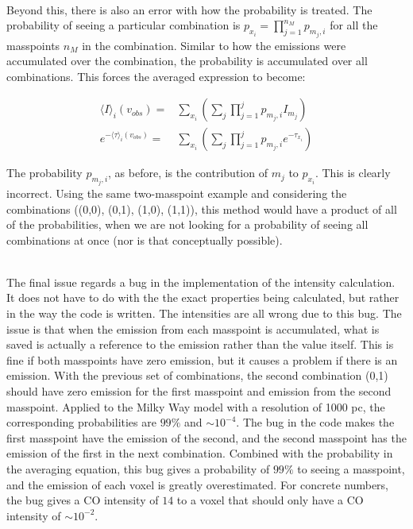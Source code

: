 \documentclass[onecolumn]{article}
\begin{document}
  \hfill \\
  
  Beyond this, there is also an error with how the probability is treated. The probability of seeing a particular combination is $p_{x_i} = \prod_{j=1}^{n_M} p_{m_j,i}$ for all the masspoints $n_M$ in the combination. Similar to how the emissions were accumulated over the combination, the probability is accumulated over all combinations. This forces the averaged expression to become:
  
  \begin{align*}
    \langle I \rangle_i(v_{obs}) =& \sum_{x_i} \left( \sum_j \prod_{j=1}^{j} p_{m_j,i} I_{m_j} \right) \\
    e^{-\langle \tau \rangle_i(v_{obs})} =& \sum_{x_i} \left( \sum_j \prod_{j=1}^{j} p_{m_j,i} e^{-\tau_{x_i}} \right)
  \end{align*}
  
  The probability $p_{m_j,i}$, as before, is the contribution of $m_j$ to $p_{x_i}$. This is clearly incorrect. Using the same two-masspoint example and considering the combinations ((0,0), (0,1), (1,0), (1,1)), this method would have a product of all of the probabilities, when we are not looking for a probability of seeing all combinations at once (nor is that conceptually possible).
  
  \hfill \\
  
  The final issue regards a bug in the implementation of the intensity calculation. It does not have to do with the the exact properties being calculated, but rather in the way the code is written. The intensities are all wrong due to this bug. The issue is that when the emission from each masspoint is accumulated, what is saved is actually a reference to the emission rather than the value itself. This is fine if both masspoints have zero emission, but it causes a problem if there is an emission. With the previous set of combinations, the second combination (0,1) should have zero emission for the first masspoint and emission from the second masspoint. Applied to the Milky Way model with a resolution of 1000 pc, the corresponding probabilities are $99\%$ and $\sim10^{-4}$. The bug in the code makes the first masspoint have the emission of the second, and the second masspoint has the emission of the first in the next combination. Combined with the probability in the averaging equation, this bug gives a probability of $99\%$ to seeing a masspoint, and the emission of each voxel is greatly overestimated. For concrete numbers, the bug gives a CO intensity of $14$ to a voxel that should only have a CO intensity of $\sim 10^{-2}$.
  
\end{document}
